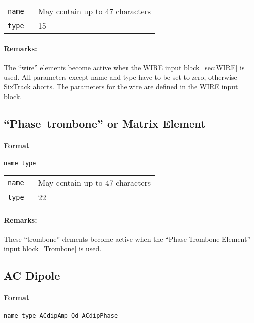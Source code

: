 \bigskip
\begin{tabular}{@{}lp{0.8\linewidth}}
    \texttt{name} & May contain up to 47 characters \\
    \texttt{type} & 15
\end{tabular}

\paragraph{Remarks:}
The ``wire'' elements become active when the WIRE input block~\ref{sec:WIRE} is used.
All parameters except name and type have to be set to zero, otherwise SixTrack aborts. The parameters for the wire are defined in the WIRE input block.

\subsection{``Phase--trombone'' or Matrix Element} \label{PT}

\paragraph{Format} \texttt{name type}

\bigskip
\begin{tabular}{@{}lp{0.8\linewidth}}
    \texttt{name} & May contain up to 47 characters \\
    \texttt{type} & 22
\end{tabular}

\paragraph{Remarks:}
These ``trombone'' elements become active when the ``Phase Trombone Element'' input block~\ref{Trombone} is used.

\subsection{AC Dipole} \label{ACDIP}

\paragraph{Format} \texttt{name type ACdipAmp Qd ACdipPhase}

